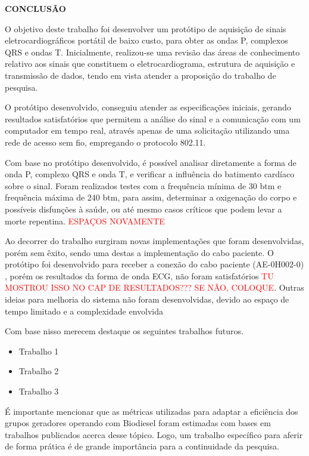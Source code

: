 \newpage
\vspace*{4cm}
\begin{center}
\textbf{CONCLUSÃO}
\end{center}
\vspace{48pt}


\hspace*{0.8cm}O objetivo deste trabalho foi desenvolver um  protótipo de aquisição de sinais eletrocardiográficos portátil de baixo custo, para obter as ondas P, complexos QRS e ondas T. Inicialmente, realizou-se uma revisão das áreas de conhecimento relativo aos sinais que constituem o eletrocardiograma, estrutura de aquisição e transmissão de dados, tendo em vista atender a proposição do trabalho de pesquisa.

O protótipo desenvolvido, conseguiu atender as especificações iniciais, gerando resultados satisfatórios que permitem a análise do sinal e a comunicação com um computador em tempo real, através apenas de uma solicitação utilizando uma rede de acesso sem fio, empregando o protocolo 802.11.

Com base no protótipo desenvolvido, é possível analisar diretamente a forma de onda P, complexo QRS e onda T, e verificar a influência do batimento cardíaco sobre o sinal. Foram realizados testes com a frequência mínima de 30 btm e frequência máxima de 240 btm, para assim,  determinar a oxigenação do corpo e possíveis disfunções à saúde, ou até mesmo casos críticos que podem levar a morte repentina. \textcolor{red}{ESPAÇOS NOVAMENTE}

Ao decorrer do trabalho surgiram novas implementações que  foram desenvolvidas, porém sem êxito, sendo uma destas a implementação do cabo paciente. O protótipo foi desenvolvido para receber a conexão do cabo paciente (AE-0H002-0) , porém os resultados da forma de onda ECG, não foram satisfatórios \textcolor{red}{TU MOSTROU ISSO NO CAP DE RESULTADOS??? SE NÃO, COLOQUE}. Outras ideias para melhoria do sistema não foram desenvolvidas, devido ao espaço de tempo limitado e a complexidade envolvida 

Com base nisso merecem destaque os seguintes trabalhos futuros.

\begin{itemize}
\item Trabalho 1
\item Trabalho 2
\item Trabalho 3
\end{itemize}

É importante mencionar que as métricas utilizadas para adaptar a eficiência dos grupos geradores operando com Biodiesel foram estimadas com bases em trabalhos publicados acerca desse tópico. Logo, um trabalho específico para aferir de forma prática é de grande importância para a continuidade da pesquisa.